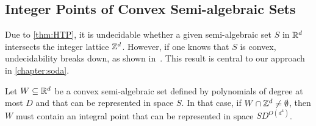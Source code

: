 \subsection{Integer Points of Convex Semi-algebraic Sets}

Due to \cref{thm:HTP}, it is undecidable whether a given semi-algebraic set $S$ in $\mathbb{R}^{d}$ intersects the integer lattice $\mathbb{Z}^{d}$. However, if one knows that $S$ is convex, undecidability breaks down, as shown in~\cite{KhachiyanP97}. This result is central to our approach in \cref{chapter:soda}.

\begin{theorem}
\label{thm:kp}
Let $W\subseteq\mathbb{R}^{d}$ be a convex semi-algebraic set defined by
polynomials of degree at most $D$ and that can be represented in space
$S$. In that case, if $W\cap\mathbb{Z}^{d}\neq\emptyset$, then $W$ must
contain an integral point that can be represented in space
$SD^{O(d^4)}$.
\end{theorem}
